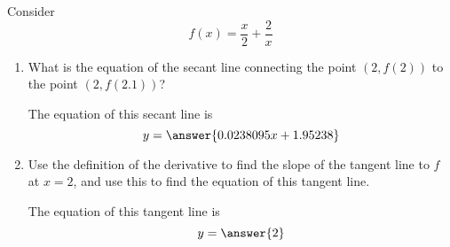 \documentclass[handout]{ximera}
\begin{document}
\begin{exercise}
Consider 
\[
f(x) = \frac{x}{2}+\frac{2}{x}
\]

\begin{enumerate}
\item What is the equation of the secant line connecting the point $(2,f(2))$ to the point $(2,f(2.1))$? 

The equation of this secant line is
$$ y = \answer{0.0238095x+1.95238 }$$ 

\item  Use the definition of the derivative to find the slope of the tangent line to $f$ at $x=2$, and use this to find the equation of this tangent line.


The equation of this tangent line is
$$ y = \answer{2}$$ 


\end{enumerate}

\end{exercise}
\end{document}
